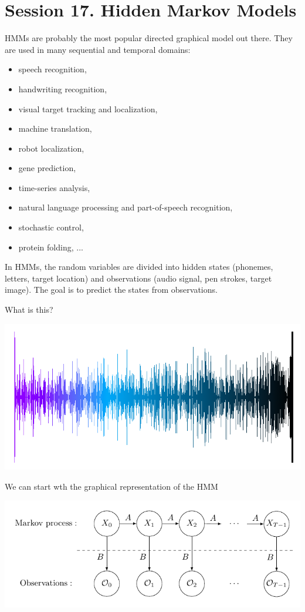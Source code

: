 \section{Session 17. Hidden Markov Models}


  HMMs are probably the most popular directed graphical model out there. They are used in many sequential and temporal domains:
  \begin{itemize}
    \item speech recognition,
    \item handwriting recognition,
    \item visual target tracking and localization,
    \item machine translation,
    \item robot localization,
    \item gene prediction,
    \item time-series analysis,
    \item natural language processing and part-of-speech recognition,
    \item stochastic control,
    \item protein folding, ...
  \end{itemize}

  In HMMs, the random variables are divided into hidden states (phonemes, letters, target location) and observations (audio signal, pen strokes, target image). The goal is to predict the states from observations.

  What is this?
\begin{center}
  \includegraphics[width=0.7\linewidth]{../figures/SultansofSwing.png}
\end{center}

We can start wth the graphical representation of the HMM
\begin{center}
 \includegraphics[width=0.7\linewidth]{../figures/HMM.pdf}
\end{center}

